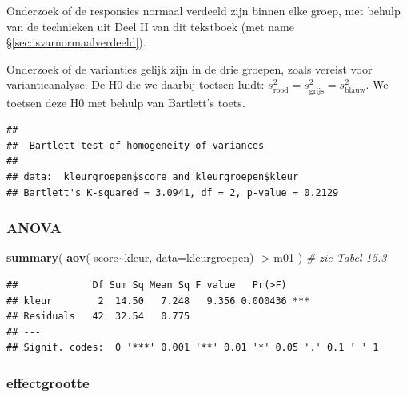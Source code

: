 \documentclass[
]{book}
\newenvironment{Shaded}{\begin{snugshade}}{\end{snugshade}}
\newcommand{\CommentTok}[1]{\textcolor[rgb]{0.56,0.35,0.01}{\textit{#1}}}
\newcommand{\DataTypeTok}[1]{\textcolor[rgb]{0.13,0.29,0.53}{#1}}
\newcommand{\KeywordTok}[1]{\textcolor[rgb]{0.13,0.29,0.53}{\textbf{#1}}}
\newcommand{\NormalTok}[1]{#1}
\newcommand{\OperatorTok}[1]{\textcolor[rgb]{0.81,0.36,0.00}{\textbf{#1}}}
\newcommand{\StringTok}[1]{\textcolor[rgb]{0.31,0.60,0.02}{#1}}
\begin{document}
Onderzoek of de responsies normaal verdeeld zijn binnen elke groep, met behulp van de
technieken uit Deel II van dit tekstboek (met name
§\ref{sec:isvarnormaalverdeeld}).

Onderzoek of de varianties gelijk zijn in de drie groepen, zoals vereist
voor variantieanalyse. De H0 die we daarbij toetsen luidt:
\(s^2_\textrm{rood} = s^2_\textrm{grijs} = s^2_\textrm{blauw}\). We
toetsen deze H0 met behulp van Bartlett's toets.

\begin{Shaded}
\end{Shaded}

\begin{verbatim}
## 
##  Bartlett test of homogeneity of variances
## 
## data:  kleurgroepen$score and kleurgroepen$kleur
## Bartlett's K-squared = 3.0941, df = 2, p-value = 0.2129
\end{verbatim}

\hypertarget{anova-2}{%
\subsubsection{ANOVA}\label{anova-2}}

\begin{Shaded}
\begin{Highlighting}[]
\KeywordTok{summary}\NormalTok{( }\KeywordTok{aov}\NormalTok{( score}\OperatorTok{\textasciitilde{}}\NormalTok{kleur, }\DataTypeTok{data=}\NormalTok{kleurgroepen) {-}\textgreater{}}\StringTok{ }\NormalTok{m01 ) }\CommentTok{\# zie Tabel 15.3}
\end{Highlighting}
\end{Shaded}

\begin{verbatim}
##             Df Sum Sq Mean Sq F value   Pr(>F)    
## kleur        2  14.50   7.248   9.356 0.000436 ***
## Residuals   42  32.54   0.775                     
## ---
## Signif. codes:  0 '***' 0.001 '**' 0.01 '*' 0.05 '.' 0.1 ' ' 1
\end{verbatim}

\hypertarget{R:omega-kwadraat}{%
\subsubsection{effectgrootte}\label{R:omega-kwadraat}}
\end{document}
